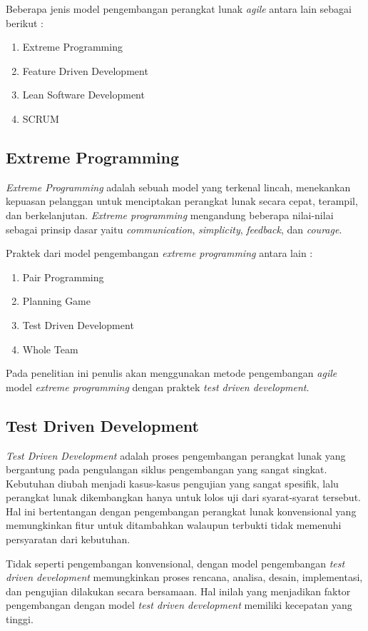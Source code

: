 \begin{spacing}{2}
    Beberapa jenis model pengembangan perangkat lunak \emph{agile} antara lain sebagai berikut :
    \begin{enumerate}
      \item Extreme Programming
      \item Feature Driven Development
      \item Lean Software Development
      \item SCRUM
    \end{enumerate}

  \subsection{Extreme Programming}
    \emph{Extreme Programming} adalah sebuah model yang terkenal lincah, menekankan kepuasan pelanggan untuk menciptakan perangkat lunak secara cepat, terampil, dan berkelanjutan. \emph{Extreme programming} mengandung beberapa nilai-nilai sebagai prinsip dasar yaitu \emph{communication}, \emph{simplicity}, \emph{feedback}, dan \emph{courage}.

    Praktek dari model pengembangan \emph{extreme programming} antara lain :
    \begin{enumerate}
      \item Pair Programming
      \item Planning Game
      \item Test Driven Development
      \item Whole Team
    \end{enumerate}

    Pada penelitian ini penulis akan menggunakan metode pengembangan \emph{agile} model \emph{extreme programming} dengan praktek \emph{test driven development}.

  \subsection{Test Driven Development}
    \emph{Test Driven Development} adalah proses pengembangan perangkat lunak yang bergantung pada pengulangan siklus pengembangan yang sangat singkat. Kebutuhan diubah menjadi kasus-kasus pengujian yang sangat spesifik, lalu perangkat lunak dikembangkan hanya untuk lolos uji dari syarat-syarat tersebut. Hal ini bertentangan dengan pengembangan perangkat lunak konvensional yang memungkinkan fitur untuk ditambahkan walaupun terbukti tidak memenuhi persyaratan dari kebutuhan.

    Tidak seperti pengembangan konvensional, dengan model pengembangan \emph{test driven development} memungkinkan proses rencana, analisa, desain, implementasi, dan pengujian dilakukan secara bersamaan. Hal inilah yang menjadikan faktor pengembangan dengan model \emph{test driven development} memiliki kecepatan yang tinggi.


\end{spacing}

